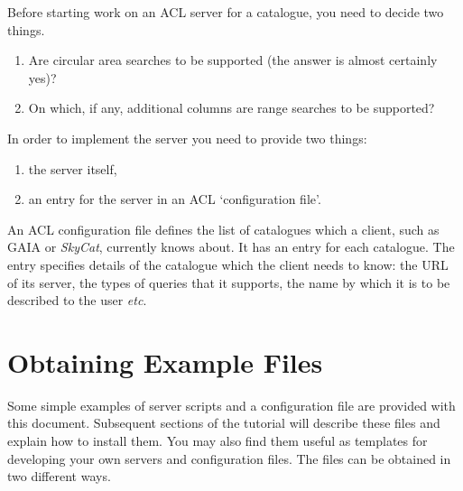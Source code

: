 \documentclass[twoside,11pt]{article}
\newcommand{\xref}[3]{#1}
\newcommand{\xlabel}[1]{}
\renewcommand{\_}{\texttt{\symbol{95}}}
\begin{document}
Before starting work on an ACL server for a catalogue, you need to decide
two things.

\begin{enumerate}

  \item Are circular area searches to be supported (the answer is almost
   certainly yes)?

  \item On which, if any, additional columns are range searches to be
   supported?

\end{enumerate}

In order to implement the server you need to provide two things:

\begin{enumerate}

  \item the server itself,

  \item an entry for the server in an ACL `configuration file'.

\end{enumerate}

An ACL configuration file defines the list of catalogues which a client,
such as \xref{GAIA}{sun214}{} or {\it SkyCat}, currently knows about.  It
has an entry for each catalogue.  The entry specifies details of the
catalogue which the client needs to know: the URL of its server, the
types of queries that it supports, the name by which it is to be described
to the user \emph{etc}.


\section{\xlabel{OBTAIN_T}\label{OBTAIN_T}Obtaining Example Files}

Some simple examples of server scripts and a configuration file are
provided with this document.  Subsequent sections of the tutorial
will describe these files and explain how to install them.  You may
also find them useful as templates for developing your own servers
and configuration files.  The files can be obtained in two different ways.
\end{document}
